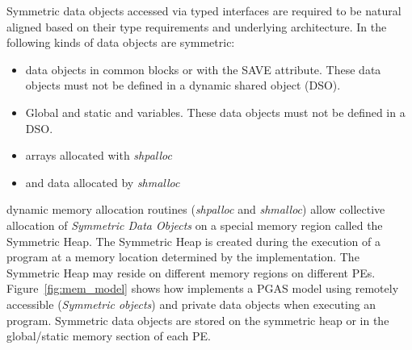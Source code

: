 Symmetric data objects accessed via typed \openshmem interfaces are required to be natural aligned based on their type requirements and underlying architecture.
In \openshmem{} the following kinds of data objects are symmetric:
\begin{itemize}
  \item \Fortran{} data objects in common blocks or with the  SAVE  attribute. These data objects must not be defined in a dynamic shared object (DSO).
  \item Global and static \Clang{} and \Cpp{} variables. These data objects must  not  be defined in a DSO.
  \item \Fortran{} arrays allocated with \textit{shpalloc} 
  \item \Clang{} and \Cpp{} data allocated by \textit{shmalloc}
\end{itemize}       

\openshmem dynamic memory allocation routines (\textit{shpalloc} and \textit{shmalloc}) allow collective allocation of \emph{Symmetric Data Objects} on a special memory region called the Symmetric Heap. The Symmetric Heap is created during the execution of a program at a memory location determined by the implementation. The Symmetric Heap may reside on different memory regions on different \ac{PE}s. Figure~\ref{fig:mem_model} shows how \openshmem implements a \ac{PGAS} model using remotely accessible (\emph{Symmetric objects}) and private data objects when executing an \openshmem program. Symmetric data objects are stored on the symmetric heap or in the global/static memory section of each \ac{PE}. 

     
